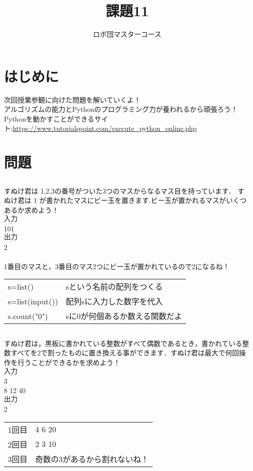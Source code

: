 \documentclass[dvipdfmx]{jsarticle}
\begin{document}
\title{課題11}
\author{ロボ団マスターコース}
\maketitle

\section{はじめに}
次回授業参観に向けた問題を解いていくよ！\\
アルゴリズムの能力とPythonのプログラミング力が養われるから頑張ろう！\\
Pythonを動かすことができるサイト:\url{https://www.tutorialspoint.com/execute_python_online.php}
\section{問題}
\subsection{}
すぬけ君は 1,2,3の番号がついた3つのマスからなるマス目を持っています．
すぬけ君は 1 が書かれたマスにビー玉を置きます.ビー玉が置かれるマスがいくつあるか求めよう！\\
$\underline{入力}$\\
101\\
$\underline{出力}$\\
2\\
\\
1番目のマスと，3番目のマス2つにビー玉が置かれているので2になるね！
\begin{table}[htb]
  \begin{tabular}{ll}
    s=list() & sという名前の配列をつくる\\
    s=list(input()) & 配列sに入力した数字を代入\\
    s.count("0") & sに0が何個あるか数える関数だよ
  \end{tabular}
\end{table}
\subsection{}
すぬけ君は，黒板に書かれている整数がすべて偶数であるとき，書かれている整数すべてを2で割ったものに置き換える事ができます．すぬけ君は最大で何回操作を行うことができるかを求めよう！\\
$\underline{入力}$\\
3\\
8 12 40\\
$\underline{出力}$\\
2\\
\begin{table}[htb]
  \begin{tabular}{ll}
    1回目 & 4 6 20\\
    2回目 & 2 3 10\\
    3回目 & 奇数の3があるから割れないね！
  \end{tabular}
\end{table}
\end{document}
